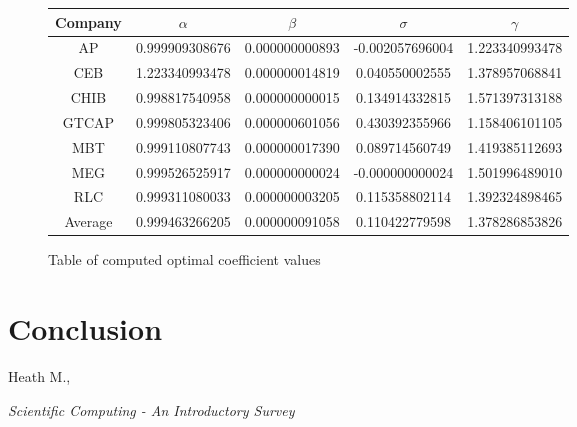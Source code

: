 \documentclass[8pt]{article}
\begin{document}
	\begin{figure}[h]
		\begin{tabular}[h]{|c|c|c|c|c|}
			\hline
			Company & $\alpha$ & $\beta$ & $\sigma$ & $\gamma$ \\\hline
			AP & 0.999909308676 & 0.000000000893 & -0.002057696004 & 1.223340993478 \\\hline
			CEB & 1.223340993478 & 0.000000014819 & 0.040550002555 & 1.378957068841 \\\hline
			CHIB & 0.998817540958 & 0.000000000015 & 0.134914332815 & 1.571397313188\\\hline
			GTCAP & 0.999805323406 & 0.000000601056 & 0.430392355966 & 1.158406101105 \\\hline
			MBT & 0.999110807743 & 0.000000017390 & 0.089714560749 & 1.419385112693\\\hline
			MEG & 0.999526525917 & 0.000000000024 & -0.000000000024 & 1.501996489010 \\\hline
			RLC & 0.999311080033 & 0.000000003205 & 0.115358802114 & 1.392324898465 \\\hline
			Average & 0.999463266205 & 0.000000091058 & 0.110422779598 & 1.378286853826 \\\hline
		\end{tabular}
		\centering
		\caption{Table of computed optimal coefficient values}
	\end{figure}

	\section{Conclusion}
	\begin{thebibliography}{9}
			Heath M.,

			\textit{Scientific Computing - An Introductory Survey}
	\end{thebibliography}
\end{document}
